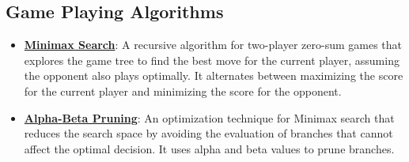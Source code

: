\documentclass{article}%
\begin{document}
\subsection{Game Playing Algorithms}%
\label{subsec:GamePlayingAlgorithms}%
\begin{itemize}[leftmargin=*]%
\item \href{https://purdue.brightspace.com/d2l/common/assets/pdfjs-d2l-dist/1.0.14-legacy/web/viewer.html?file=\%2Fcontent\%2Fenforced\%2F1095467-wl.202510.CS.24300.001\%2F02L2-Intro.pdf\%3Fou\%3D1095467\&lang=en-us\&container=d2l-fileviewer-rendered-pdf\&fullscreen=d2l-fileviewer-rendered-pdf-dialog\&height=667#page=22}{\textbf{Minimax Search}}: A recursive algorithm for two{-}player zero{-}sum games that explores the game tree to find the best move for the current player, assuming the opponent also plays optimally. It alternates between maximizing the score for the current player and minimizing the score for the opponent.%
\item \href{https://purdue.brightspace.com/d2l/common/assets/pdfjs-d2l-dist/1.0.14-legacy/web/viewer.html?file=\%2Fcontent\%2Fenforced\%2F1095467-wl.202510.CS.24300.001\%2F02L2-Intro.pdf\%3Fou\%3D1095467\&lang=en-us\&container=d2l-fileviewer-rendered-pdf\&fullscreen=d2l-fileviewer-rendered-pdf-dialog\&height=667#page=23}{\textbf{Alpha{-}Beta Pruning}}: An optimization technique for Minimax search that reduces the search space by avoiding the evaluation of branches that cannot affect the optimal decision. It uses alpha and beta values to prune branches.%
\end{itemize}

%
\end{document}
